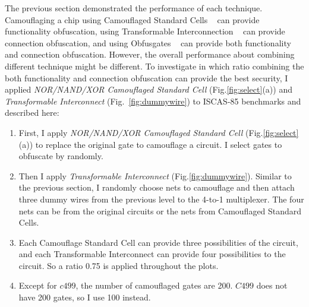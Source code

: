 \documentclass[thesis]{umassthesis}  %
\begin{document}
The previous section demonstrated the performance of each technique. Camouflaging a chip using Camouflaged Standard Cells ~\cite{chow-2007-integrated} can provide functionality obfuscation, using Transformable Interconnection ~\cite{chen-2015-dummyWire} can provide connection obfuscation, and using Obfusgates ~\cite{malik-obfusgate} can provide both functionality and connection obfuscation. However, the overall performance about combining different technique might be different. To investigate in which ratio combining the both functionality and connection obfuscation can provide the best security, I applied \textit{NOR/NAND/XOR Camouflaged Standard Cell} (Fig.\ref{fig:select}(a)) and \textit{Transformable Interconnect} (Fig.~\ref{fig:dummywire}) to ISCAS-85 benchmarks and described here:

\begin{enumerate}
\item First, I apply \textit{NOR/NAND/XOR Camouflaged Standard Cell} (Fig.\ref{fig:select}(a)) to replace the original gate to camouflage a circuit. I select gates to obfuscate by randomly.

\item Then I apply \textit{Transformable Interconnect} (Fig.\ref{fig:dummywire}). Similar to the previous section, I randomly choose nets to camouflage and then attach three dummy wires from the previous level to the 4-to-1 multiplexer. The four nets can be from the original circuits or the nets from Camouflaged Standard Cells. 

\item  Each Camouflage Standard Cell can provide three possibilities of the circuit, and each Transformable Interconnect can provide four possibilities to the circuit. So a ratio 0.75 is applied throughout the plots.
 
\item Except for $c499$, the number of camouflaged gates are 200. $C499$ does not have 200 gates, so I use 100 instead.
\end{enumerate}
\end{document}

